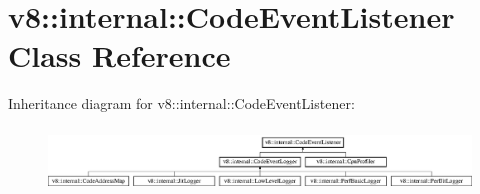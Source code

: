 \hypertarget{classv8_1_1internal_1_1_code_event_listener}{}\section{v8\+:\+:internal\+:\+:Code\+Event\+Listener Class Reference}
\label{classv8_1_1internal_1_1_code_event_listener}
Inheritance diagram for v8\+:\+:internal\+:\+:Code\+Event\+Listener\+:\begin{figure}[H]
\begin{center}
\leavevmode
\includegraphics[height=1.723077cm]{classv8_1_1internal_1_1_code_event_listener}
\end{center}
\end{figure}
